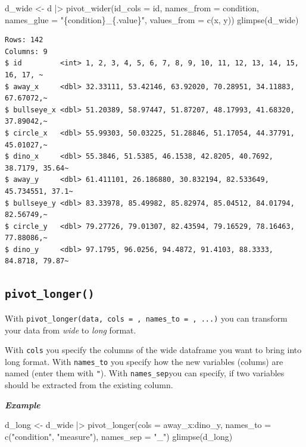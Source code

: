 \documentclass[
  letterpaper,
  DIV=11,
  numbers=noendperiod,
  oneside]{scrreprt}
\newenvironment{Shaded}{\begin{snugshade}}{\end{snugshade}}
\newcommand{\AttributeTok}[1]{\textcolor[rgb]{0.40,0.45,0.13}{#1}}
\newcommand{\FunctionTok}[1]{\textcolor[rgb]{0.28,0.35,0.67}{#1}}
\newcommand{\NormalTok}[1]{\textcolor[rgb]{0.00,0.23,0.31}{#1}}
\newcommand{\OtherTok}[1]{\textcolor[rgb]{0.00,0.23,0.31}{#1}}
\newcommand{\SpecialCharTok}[1]{\textcolor[rgb]{0.37,0.37,0.37}{#1}}
\newcommand{\StringTok}[1]{\textcolor[rgb]{0.13,0.47,0.30}{#1}}
\begin{document}
\begin{Shaded}
\begin{Highlighting}[]
\NormalTok{d\_wide }\OtherTok{\textless{}{-}}\NormalTok{ d }\SpecialCharTok{|\textgreater{}} \FunctionTok{pivot\_wider}\NormalTok{(}\AttributeTok{id\_cols =}\NormalTok{ id, }\AttributeTok{names\_from =}\NormalTok{ condition, }\AttributeTok{names\_glue =} \StringTok{"\{condition\}\_\{.value\}"}\NormalTok{, }\AttributeTok{values\_from =} \FunctionTok{c}\NormalTok{(x, y))}
\FunctionTok{glimpse}\NormalTok{(d\_wide)}
\end{Highlighting}
\end{Shaded}

\begin{verbatim}
Rows: 142
Columns: 9
$ id         <int> 1, 2, 3, 4, 5, 6, 7, 8, 9, 10, 11, 12, 13, 14, 15, 16, 17, ~
$ away_x     <dbl> 32.33111, 53.42146, 63.92020, 70.28951, 34.11883, 67.67072,~
$ bullseye_x <dbl> 51.20389, 58.97447, 51.87207, 48.17993, 41.68320, 37.89042,~
$ circle_x   <dbl> 55.99303, 50.03225, 51.28846, 51.17054, 44.37791, 45.01027,~
$ dino_x     <dbl> 55.3846, 51.5385, 46.1538, 42.8205, 40.7692, 38.7179, 35.64~
$ away_y     <dbl> 61.411101, 26.186880, 30.832194, 82.533649, 45.734551, 37.1~
$ bullseye_y <dbl> 83.33978, 85.49982, 85.82974, 85.04512, 84.01794, 82.56749,~
$ circle_y   <dbl> 79.27726, 79.01307, 82.43594, 79.16529, 78.16463, 77.88086,~
$ dino_y     <dbl> 97.1795, 96.0256, 94.4872, 91.4103, 88.3333, 84.8718, 79.87~
\end{verbatim}

\hypertarget{pivot_longer}{%
\subsection{\texorpdfstring{\texttt{pivot\_longer()}}{pivot\_longer()}}\label{pivot_longer}}

With \texttt{pivot\_longer(data,\ cols\ =\ ,\ names\_to\ =\ ,\ ...)} you
can transform your data from \emph{wide} to \emph{long} format.

With \texttt{cols} you specify the columns of the wide dataframe you
want to bring into long format. With \texttt{names\_to} you specify how
the new variables (colums) are named (enter them with \texttt{"}). With
\texttt{names\_sep}you can specify, if two variables should be extracted
from the existing column.

\textbf{\emph{Example}}

\begin{Shaded}
\begin{Highlighting}[]
\NormalTok{d\_long }\OtherTok{\textless{}{-}}\NormalTok{ d\_wide }\SpecialCharTok{|\textgreater{}} \FunctionTok{pivot\_longer}\NormalTok{(}\AttributeTok{cols =}\NormalTok{ away\_x}\SpecialCharTok{:}\NormalTok{dino\_y, }\AttributeTok{names\_to =} \FunctionTok{c}\NormalTok{(}\StringTok{"condition"}\NormalTok{, }\StringTok{"measure"}\NormalTok{), }\AttributeTok{names\_sep =} \StringTok{"\_"}\NormalTok{)}
\FunctionTok{glimpse}\NormalTok{(d\_long)}
\end{Highlighting}
\end{Shaded}
\end{document}

